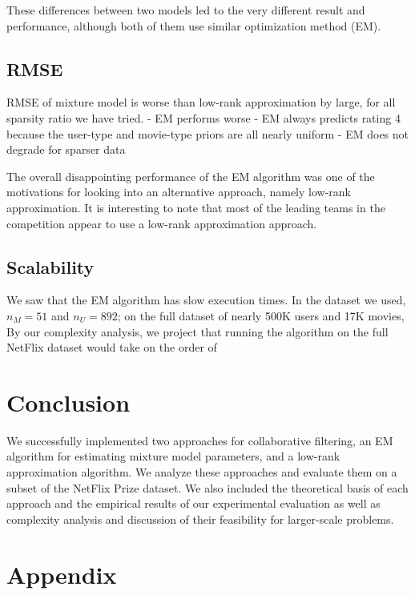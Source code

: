 \documentclass{article}
\begin{document}
These differences between two models led to the very different result and performance, although both of them use similar optimization method (EM).


\subsection{RMSE}
RMSE of mixture model is worse than low-rank approximation by large, for all sparsity ratio we have tried. 
- EM performs worse
  - EM always predicts rating 4 because the user-type and movie-type
    priors are all nearly uniform
- EM does not degrade for sparser data

The overall disappointing performance of the EM algorithm was one of
the motivations for looking into an alternative approach, namely
low-rank approximation. It is interesting to note that most of the
leading teams in the competition appear to use a low-rank approximation
approach.

\subsection{Scalability}

We saw that the EM algorithm has slow execution times. In the dataset
we used, $n_M = 51$ and $n_U = 892$; on the full dataset of nearly
500K users and 17K movies, By our complexity analysis, we project that
running the algorithm on the full NetFlix dataset would take on the
order of \TODO{}

\section{Conclusion}


We successfully implemented two approaches for collaborative
filtering, an EM algorithm for estimating mixture model parameters,
and a low-rank approximation algorithm.  We analyze these approaches
and evaluate them on a subset of the NetFlix Prize dataset. We also
included the theoretical basis of each approach and the empirical
results of our experimental evaluation as well as complexity analysis
and discussion of their feasibility for larger-scale problems.

\section{Appendix}
\end{document}
